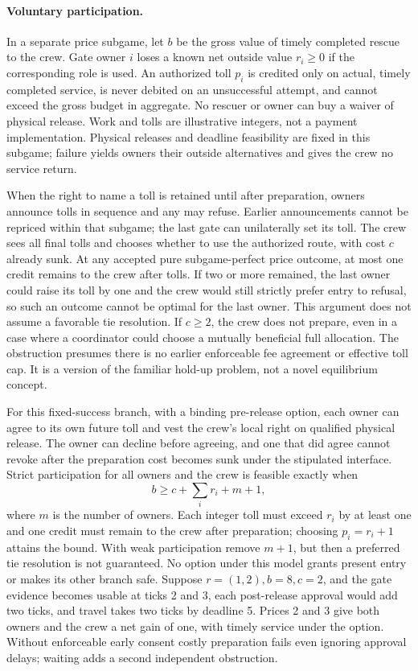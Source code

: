 \documentclass[11pt]{article}
\begin{document}
\paragraph{Voluntary participation.}
In a separate price subgame, let \(b\) be the gross value of timely completed rescue to the crew. Gate owner \(i\) loses a known net outside value \(r_i\ge0\) if the corresponding role is used. An authorized toll \(p_i\) is credited only on actual, timely completed service, is never debited on an unsuccessful attempt, and cannot exceed the gross budget in aggregate. No rescuer or owner can buy a waiver of physical release. Work and tolls are illustrative integers, not a payment implementation. Physical releases and deadline feasibility are fixed in this subgame; failure yields owners their outside alternatives and gives the crew no service return.
\par
When the right to name a toll is retained until after preparation, owners announce tolls in sequence and any may refuse. Earlier announcements cannot be repriced within that subgame; the last gate can unilaterally set its toll. The crew sees all final tolls and chooses whether to use the authorized route, with cost \(c\) already sunk. At any accepted pure subgame-perfect price outcome, at most one credit remains to the crew after tolls. If two or more remained, the last owner could raise its toll by one and the crew would still strictly prefer entry to refusal, so such an outcome cannot be optimal for the last owner. This argument does not assume a favorable tie resolution. If \(c\ge2\), the crew does not prepare, even in a case where a coordinator could choose a mutually beneficial full allocation. The obstruction presumes there is no earlier enforceable fee agreement or effective toll cap. It is a version of the familiar hold-up problem, not a novel equilibrium concept.
\par
For this fixed-success branch, with a binding pre-release option, each owner can agree to its own future toll and vest the crew's local right on qualified physical release. The owner can decline before agreeing, and one that did agree cannot revoke after the preparation cost becomes sunk under the stipulated interface. Strict participation for all owners and the crew is feasible exactly when
\[
 b\ge c+\sum_i r_i + m+1 ,
\]
where \(m\) is the number of owners. Each integer toll must exceed \(r_i\) by at least one and one credit must remain to the crew after preparation; choosing \(p_i=r_i+1\) attains the bound. With weak participation remove \(m+1\), but then a preferred tie resolution is not guaranteed. No option under this model grants present entry or makes its other branch safe. Suppose \(r=(1,2), b=8,c=2\), and the gate evidence becomes usable at ticks 2 and 3, each post-release approval would add two ticks, and travel takes two ticks by deadline 5. Prices 2 and 3 give both owners and the crew a net gain of one, with timely service under the option. Without enforceable early consent costly preparation fails even ignoring approval delays; waiting adds a second independent obstruction.
\end{document}
